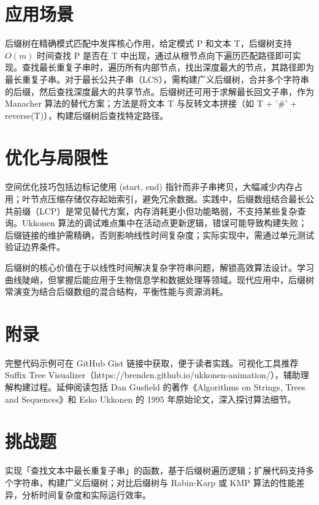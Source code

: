 \chapter{应用场景}
后缀树在精确模式匹配中发挥核心作用，给定模式 P 和文本 T，后缀树支持 $O(m)$ 时间查找 P 是否在 T 中出现，通过从根节点向下遍历匹配路径即可实现。查找最长重复子串时，遍历所有内部节点，找出深度最大的节点，其路径即为最长重复子串。对于最长公共子串（LCS），需构建广义后缀树，合并多个字符串的后缀，然后查找深度最大的共享节点。后缀树还可用于求解最长回文子串，作为 Manacher 算法的替代方案；方法是将文本 T 与反转文本拼接（如 T + '\#{}' + reverse(T)），构建后缀树后查找特定路径。\par
\chapter{优化与局限性}
空间优化技巧包括边标记使用 (start, end) 指针而非子串拷贝，大幅减少内存占用；叶节点压缩存储仅存起始索引，避免冗余数据。实践中，后缀数组结合最长公共前缀（LCP）是常见替代方案，内存消耗更小但功能略弱，不支持某些复杂查询。Ukkonen 算法的调试难点集中在活动点更新逻辑，错误可能导致构建失败；后缀链接的维护需精确，否则影响线性时间复杂度；实际实现中，需通过单元测试验证边界条件。\par
后缀树的核心价值在于以线性时间解决复杂字符串问题，解锁高效算法设计。学习曲线陡峭，但掌握后能应用于生物信息学和数据处理等领域。现代应用中，后缀树常演变为结合后缀数组的混合结构，平衡性能与资源消耗。\par
\chapter{附录}
完整代码示例可在 GitHub Gist 链接中获取，便于读者实践。可视化工具推荐 Suffix Tree Visualizer（https://brenden.github.io/ukkonen-animation/），辅助理解构建过程。延伸阅读包括 Dan Gusfield 的著作《Algorithms on Strings, Trees and Sequences》和 Esko Ukkonen 的 1995 年原始论文，深入探讨算法细节。\par
\chapter{挑战题}
实现「查找文本中最长重复子串」的函数，基于后缀树遍历逻辑；扩展代码支持多个字符串，构建广义后缀树；对比后缀树与 Rabin-Karp 或 KMP 算法的性能差异，分析时间复杂度和实际运行效率。\par

